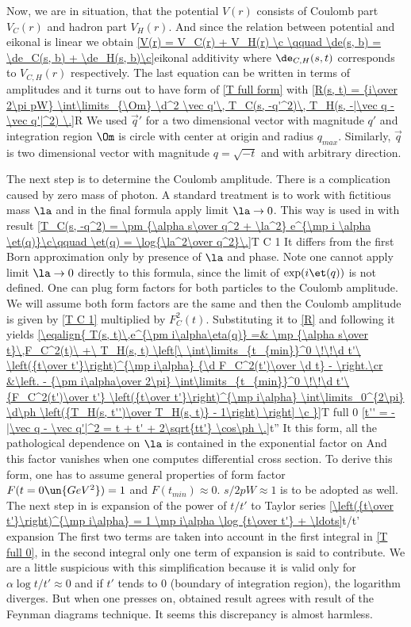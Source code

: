 Now, we are in situation, that the potential $V(r)$ consists of Coulomb part $V_C(r)$ and hadron part $V_H(r)$. And since the relation between potential and eikonal is linear we obtain
\eqref{V(r) = V_C(r) + V_H(r) \c \qquad \de(s, b) = \de_C(s, b) + \de_H(s, b)\c}{eikonal additivity}
where $\de_{C,H}(s, t)$ corresponds to $V_{C, H}(r)$ respectively. The last equation can be written in terms of amplitudes and it turns out to have form of \ref{T full form} with
\eqref{R(s, t) = {i\over 2\pi pW} \int\limits_{\Om} \d^2 \vec q'\, T_C(s, -q'^2)\, T_H(s, -|\vec q - \vec q'|^2) \.}{R}
We used $\vec q'$ for a two dimensional vector with magnitude $q'$ and integration region $\Om$ is circle with center at origin and radius $q_{max}$. Similarly, $\vec q$ is two dimensional vector with magnitude $q = \sqrt{-t}$ and with arbitrary direction.

The next step is to determine the Coulomb amplitude. There is a complication caused by zero mass of photon. A standard treatment is to work with fictitious mass $\la$ and in the final formula apply limit $\la\to 0$. This way is used in  with result
\eqref{T_C(s, -q^2) = \pm {\alpha s\over q^2 + \la^2} e^{\mp i \alpha \et(q)}\c\qquad \et(q) = \log{\la^2\over q^2}\.}{T C 1}
It differs from the first Born approximation only by presence of $\la$ and phase. Note one cannot apply limit $\la\to 0$ directly to this formula, since the limit of $\exp(i\et(q))$ is not defined. One can plug form factors for both particles to the Coulomb amplitude. We will assume both form factors are the same and then the Coulomb amplitude is given by \ref{T C 1} multiplied by $F_C^2(t)$. Substituting it to \ref{R} and following  it yields
\eqref{\eqalign{
T(s, t)\,e^{\pm i\alpha\eta(q)} =& \mp {\alpha s\over t}\,F_C^2(t)\ +\ T_H(s, t) \left[\ 
\int\limits_{t_{min}}^0 \!\!\d t'\ \left({t\over t'}\right)^{\mp i\alpha} {\d F_C^2(t')\over \d t} - \right.\cr 
&\left. - {\pm i\alpha\over 2\pi} \int\limits_{t_{min}}^0 \!\!\d t'\  {F_C^2(t')\over t'} \left({t\over t'}\right)^{\mp i\alpha} \int\limits_0^{2\pi} \d\ph \left({T_H(s, t'')\over T_H(s, t)}  - 1\right) \right] \c
}}{T full 0}
\eqref{t'' = -|\vec q - \vec q'|^2 = t + t' + 2\sqrt{tt'} \cos\ph \.}{t''}
It this form, all the pathological dependence on $\la$ is contained in the exponential factor on \lhs{} And this factor vanishes when one computes differential cross section. To derive this form, one has to assume general properties of form factor $F(t=0\un{GeV^2}) = 1$ and $F(t_{min}) \approx 0$. $s/2pW\approx 1$ is to be adopted as well. The next step in  is expansion of the power of $t/t'$ to Taylor series
\eqref{\left({t\over t'}\right)^{\mp i\alpha} = 1 \mp i\alpha \log {t\over t'} + \ldots}{t/t' expansion}
The first two terms are taken into account in the first integral in \ref{T full 0}, in the second integral only one term of expansion is said to contribute. We are a little suspicious with this simplification because it is valid only for $\alpha \log t/t' \approx 0$ and if $t'$ tends to $0$ (boundary of integration region), the logarithm diverges. But when one presses on, obtained result agrees with result of the Feynman diagrams technique. It seems this discrepancy is almost harmless.

